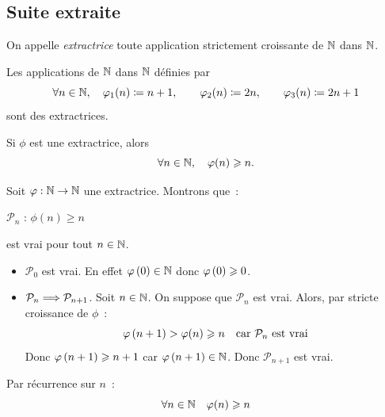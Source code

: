 \documentclass{magnoliaold}
\begin{document}
\subsection{Suite extraite}

\begin{definition}[utile=-3]
On appelle \emph{extractrice} toute application strictement croissante de $\mathbb{N}$ dans
$\mathbb{N}$.  
\end{definition}

\begin{remarqueUnique}
\remarque Les applications de $\mathbb{N}$ dans $\mathbb{N}$ définies par
  \[\forall n\in\mathbb{N} ,\quad \varphi_1(n)\coloneqq n+1, \qquad \varphi_2(n)\coloneqq 2n, \qquad
    \varphi_3(n)\coloneqq 2n+1\]
  sont des extractrices.
\end{remarqueUnique}


\begin{proposition}[utile=-3]
Si $\phi$ est une extractrice, alors
\[\forall n\in\mathbb{N} ,\quad \varphi(n)\geqslant n.\]
\end{proposition}

\begin{preuve}
Soit $\varphi:\mathbb{N}\to\mathbb{N}$ une extractrice. Montrons que~:
\begin{center}
$\mathcal{P}_n$ : \og $\phi(n)\geq n$ \fg
\end{center}
est vrai pour tout $n\in\mathbb{N}$.
\begin{itemize}
\item $\mathcal{P}_0$ est vrai. En effet $\varphi\left(0\right)\in\mathbb{N}$ donc
  $\varphi\left(0\right)\geqslant 0$.
\item $\mathcal{P}_n\Longrightarrow\mathcal{P}_{n+1}$. Soit $n\in\mathbb{N}$. On suppose que
  $\mathcal{P}_n$ est vrai. Alors, par stricte croissance de $\phi$~:
  \[\varphi\left(n+1\right)>\varphi(n)\geqslant n \quad \text{car $\mathcal{P}_n$ est vrai}\]
  Donc $\varphi\left(n+1\right)\geqslant n+1$ car $\varphi\left(n+1\right)\in\mathbb{N}$. Donc
  $\mathcal{P}_{n+1}$ est vrai.
\end{itemize}
Par récurrence sur $n$~:
\[\forall n\in\mathbb{N} \quad \varphi(n)\geqslant n\]
\end{preuve}
\end{document}
